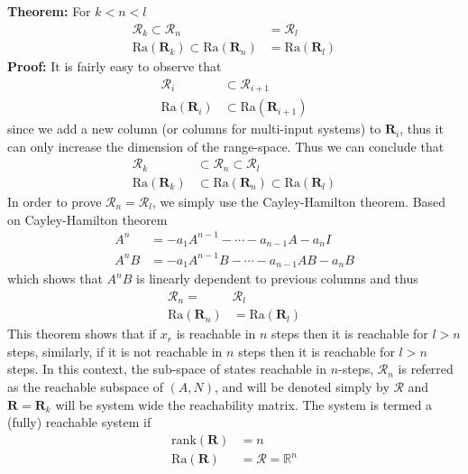 \documentclass[twoside]{article}
\begin{document}
\textbf{Theorem:} For $k < n < l$
%
\begin{align*}
 \mathcal{R}_k \subset \mathcal{R}_{n} &= \mathcal{R}_{l} 
  \\
  \mathrm{Ra} ( \mathbf{R}_k ) \subset \mathrm{Ra} ( \mathbf{R}_{n} ) &= \mathrm{Ra} ( \mathbf{R}_{l} )
\end{align*}
%
\textbf{Proof:} It is fairly easy to observe that
%
\begin{align*}
\mathcal{R}_i & \subset \mathcal{R}_{i+1} 
\\
\mathrm{Ra} ( \mathbf{R}_i ) & \subset \mathrm{Ra} ( \mathbf{R}_{i+1} )
\end{align*}
%
since we add a new column (or columns for multi-input systems) to $ \mathbf{R}_i$, thus it can only increase the dimension of the range-space. Thus we can conclude that 
%
%
\begin{align*}
 \mathcal{R}_k &\subset \mathcal{R}_{n} \subset \mathcal{R}_{l} 
  \\
  \mathrm{Ra} ( \mathbf{R}_k ) &\subset \mathrm{Ra} ( \mathbf{R}_{n} ) \subset \mathrm{Ra} ( \mathbf{R}_{l} )
\end{align*}
%
In order to prove $\mathcal{R}_{n} = \mathcal{R}_{l} $, we simply use the Cayley-Hamilton theorem. 
Based on Cayley-Hamilton theorem 
%
\begin{align*}
 A^n &= -a_1 A^{n-1} - \cdots - a_{n-1} A - a_n I
 \\
 A^n B &= -a_1 A^{n-1} B - \cdots - a_{n-1} A B - a_n B
\end{align*}
%
which shows that $ A^n B$ is linearly dependent to previous columns and thus 
%
%
\begin{align*}
\mathcal{R}_{n} =& \mathcal{R}_{l} 
  \\
\mathrm{Ra} ( \mathbf{R}_{n} ) &= \mathrm{Ra} ( \mathbf{R}_{l} )
\end{align*}
%
This theorem shows that if $x_r$ is reachable in $n$ steps then it is reachable for $l > n$ steps, similarly, if it is not reachable in 
$n$ steps then it is reachable for $l > n$ steps. In this context, the sub-space of states reachable in $n$-steps, $\mathcal{R}_n$
is referred as the reachable subspace of $(A,N)$, and will be denoted simply by $\mathcal{R}$ and $\mathbf{R} = \mathbf{R}_k$ will be system 
wide the reachability matrix. The system is termed a (fully) reachable system if 
%
\begin{align*}
 \mathrm{rank} (\mathbf{R}) &= n 
 \\
 \mathrm{Ra} (\mathbf{R}) &= \mathcal{R} = \mathbb{R}^n
\end{align*}
\end{document}
